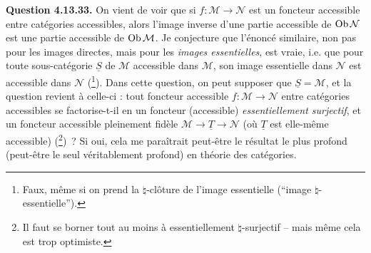 \textbf{Question 4.13.33.} On vient de voir que si $f : \mathcal{M} \longrightarrow \mathcal{N}$ est un foncteur accessible entre catégories accessibles, alors l'image inverse d'une partie accessible de $\operatorname{Ob} \mathcal{N}$ est une partie accessible de $\operatorname{Ob} \mathcal{M}$. Je conjecture que l'énoncé similaire, non pas pour les images directes, mais pour les \textit{images essentielles}, est
vraie, i.e. que pour toute sous-catégorie $\underline{S}$ de $\mathcal{M}$ accessible dans $\mathcal{M}$, son image essentielle dans $\mathcal{N}$ est accessible dans $\mathcal{N}$ (\footnote[156]{Faux, même si on prend la $\natural$-clôture de l'image essentielle (“image $\natural$-essentielle”).}). Dans cette question, on peut supposer que $\underline{S} = \mathcal{M}$, et la question revient à celle-ci : tout foncteur accessible $f : \mathcal{M} \longrightarrow \mathcal{N}$ entre catégories accessibles se factorise-t-il en un foncteur (accessible) \textit{essentiellement surjectif}, et un foncteur accessible pleinement fidèle $\mathcal{M} \longrightarrow \underline{T} \longrightarrow \mathcal{N}$ (où $\underline{T}$ est elle-même accessible) (\footnote[157]{Il faut se borner tout au moins à essentiellement $\natural$-surjectif – mais même cela est trop optimiste.})~? Si oui, cela me paraîtrait peut-être le résultat le plus profond (peut-être le seul véritablement profond) en théorie des catégories. %

